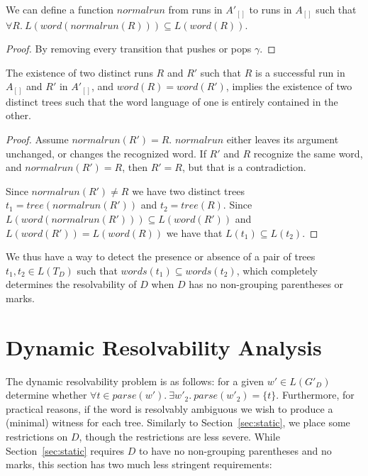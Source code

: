 \documentclass[runningheads]{llncs}
\newcommand{\parse}{\mathit{parse}} %
\newcommand{\words}{\mathit{words}} %
\newcommand{\pospl}{[}
\newcommand{\pospr}{]}
\newcommand{\posp}[1]{\pospl#1\pospr}
\newcommand{\runtotree}{\mathit{tree}}
\newcommand{\runtoword}{\mathit{word}}
\newcommand{\runprimetorun}{\mathit{normalrun}}
\begin{document}
\begin{lemma}
  We can define a function $\runprimetorun$ from runs in $A'_{\posp{}}$ to runs in $A_{\posp{}}$ such that $\forall R.\ L(\runtoword(\runprimetorun(R))) \subseteq L(\runtoword(R))$.
\end{lemma}

\begin{proof}
  By removing every transition that pushes or pops $\gamma$.
\end{proof}

\begin{theorem}
  The existence of two distinct runs $R$ and $R'$ such that $R$ is a successful run in $A_{\posp{}}$ and $R'$ in $A'_{\posp{}}$, and $\runtoword(R) = \runtoword(R')$, implies the existence of two distinct trees such that the word language of one is entirely contained in the other.
\end{theorem}

\begin{proof}
  Assume $\runprimetorun(R') = R$. $\runprimetorun$ either leaves its argument unchanged, or changes the recognized word. If $R'$ and $R$ recognize the same word, and $\runprimetorun(R') = R$, then $R' = R$, but that is a contradiction.

  Since $\runprimetorun(R') \neq R$ we have two distinct trees $t_1 = \runtotree(\runprimetorun(R'))$ and $t_2 = \runtotree(R)$. Since $L(\runtoword(\runprimetorun(R'))) \subseteq L(\runtoword(R'))$ and $L(\runtoword(R')) = L(\runtoword(R))$ we have that $L(t_1) \subseteq L(t_2)$.
\end{proof}

We thus have a way to detect the presence or absence of a pair of trees $t_1, t_2 \in L(T_D)$ such that $\words(t_1) \subseteq \words(t_2)$, which completely determines the resolvability of $D$ when $D$ has no non-grouping parentheses or marks.

\section{Dynamic Resolvability Analysis} \label{sec:dynamic}

The dynamic resolvability problem is as follows: for a given $w' \in L(G'_D)$ determine whether $\forall t \in \parse(w').\ \exists w'_2.\ \parse(w'_2) = \{t\}$. Furthermore, for practical reasons, if the word is resolvably ambiguous we wish to produce a (minimal) witness for each tree. Similarly to Section~\ref{sec:static}, we place some restrictions on $D$, though the restrictions are less severe. While Section~\ref{sec:static} requires $D$ to have no non-grouping parentheses and no marks, this section has two much less stringent requirements:
\end{document}
